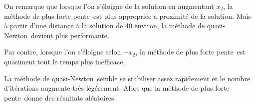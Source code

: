 \documentclass[11pt,a4paper,twoside,onecolumn,titlepage]{report}
\newcommand{\qn}{quasi-Newton}
\newcommand{\pfp}{plus forte pente}
\begin{document}
\begin{enumerate}[(a)]
On remarque que lorsque l'on s'éloigne de la solution en augmentant $x_2$, la méthode de \pfp\ est plus appropriée à proximité de la solution. Mais à partir d'une distance à la solution de 40 environ, la méthode de \qn\ devient plus performante.

Par contre, lorsque l'on s'éloigne selon $-x_2$, la méthode de \pfp\ est quasiment tout le temps plus inefficace.

La méthode de \qn\ semble se stabiliser assez rapidement et le nombre d'itérations augmente très légérement. Alors que la méthode de \pfp\ donne des résultats aléatoires.


\end{enumerate}
\end{document}
